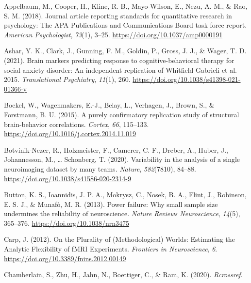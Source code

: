 \documentclass[
  man,floatsintext]{apa6}
\newlength{\cslhangindent}
\newlength{\cslentryspacingunit} %
\newenvironment{CSLReferences}[2] %
 {%
  \setlength{\parindent}{0pt}
  \ifodd #1
  \let\oldpar\par
  \def\par{\hangindent=\cslhangindent\oldpar}
  \fi
  \setlength{\parskip}{#2\cslentryspacingunit}
 }%
 {}
\begin{document}
\hypertarget{refs}{}
\begin{CSLReferences}{1}{0}
\leavevmode{}%
Appelbaum, M., Cooper, H., Kline, R. B., Mayo-Wilson, E., Nezu, A. M., \& Rao, S. M. (2018). Journal article reporting standards for quantitative research in psychology: {The APA Publications} and {Communications Board} task force report. \emph{American Psychologist}, \emph{73}(1), 3--25. \url{https://doi.org/10.1037/amp0000191}

\leavevmode{}%
Ashar, Y. K., Clark, J., Gunning, F. M., Goldin, P., Gross, J. J., \& Wager, T. D. (2021). Brain markers predicting response to cognitive-behavioral therapy for social anxiety disorder: An independent replication of {Whitfield}-{Gabrieli} et al. 2015. \emph{Translational Psychiatry}, \emph{11}(1), 260. \url{https://doi.org/10.1038/s41398-021-01366-y}

\leavevmode{}%
Boekel, W., Wagenmakers, E.-J., Belay, L., Verhagen, J., Brown, S., \& Forstmann, B. U. (2015). A purely confirmatory replication study of structural brain-behavior correlations. \emph{Cortex}, \emph{66}, 115--133. \url{https://doi.org/10.1016/j.cortex.2014.11.019}

\leavevmode{}%
Botvinik-Nezer, R., Holzmeister, F., Camerer, C. F., Dreber, A., Huber, J., Johannesson, M., \ldots{} Schonberg, T. (2020). Variability in the analysis of a single neuroimaging dataset by many teams. \emph{Nature}, \emph{582}(7810), 84--88. \url{https://doi.org/10.1038/s41586-020-2314-9}

\leavevmode{}%
Button, K. S., Ioannidis, J. P. A., Mokrysz, C., Nosek, B. A., Flint, J., Robinson, E. S. J., \& Munafò, M. R. (2013). Power failure: Why small sample size undermines the reliability of neuroscience. \emph{Nature Reviews Neuroscience}, \emph{14}(5), 365--376. \url{https://doi.org/10.1038/nrn3475}

\leavevmode{}%
Carp, J. (2012). On the {Plurality} of ({Methodological}) {Worlds}: {Estimating} the {Analytic Flexibility} of {fMRI Experiments}. \emph{Frontiers in Neuroscience}, \emph{6}. \url{https://doi.org/10.3389/fnins.2012.00149}

\leavevmode{}%
Chamberlain, S., Zhu, H., Jahn, N., Boettiger, C., \& Ram, K. (2020). \emph{Rcrossref}.


\end{CSLReferences}
\end{document}
